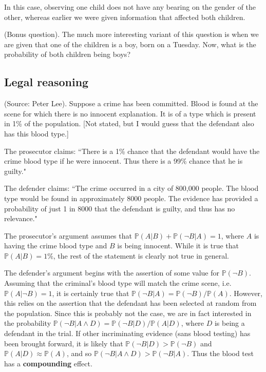 \documentclass{article}
\begin{document}
In this case, observing one child does not have any bearing on the gender of the other, whereas earlier we were given information that affected both children.

(Bonus question). The much more interesting variant of this question is when we are given that one of the children is a boy, born on a Tuesday. Now, what is the probability of both children being boys?

\subsection{Legal reasoning}
(Source: Peter Lee). Suppose a crime has been committed. Blood is found at the scene for which there is no innocent explanation. It is of a type which is present in 1\% of the population. [Not stated, but I would guess that the defendant also has this blood type.]

The prosecutor claims: ``There is a 1\% chance that the defendant would have the crime blood type if he were innocent. Thus there is a 99\% chance that he is guilty."

The defender claims: ``The crime occurred in a city of 800,000 people. The blood type would be found in approximately 8000 people. The evidence has provided a probability of just 1 in 8000 that the defendant is guilty, and thus has no relevance."

The prosecutor's argument assumes that $\mathbb{P}(A|B) + \mathbb{P}(\neg B|A) = 1$, where $A$ is having the crime blood type and $B$ is being innocent. While it is true that $\mathbb{P}(A|B)=1\%$, the rest of the statement is clearly not true in general.

The defender's argument begins with the assertion of some value for $\mathbb{P}(\neg B)$. Assuming that the criminal's blood type will match the crime scene, i.e. $\mathbb{P}(A|\neg B) = 1$, it is certainly true that $\mathbb{P}(\neg B|A) = \mathbb{P}(\neg B)/\mathbb{P}(A)$. However, this relies on the assertion that the defendant has been selected at random from the population. Since this is probably not the case, we are in fact interested in the probability $\mathbb{P}(\neg B|A \land D) = \mathbb{P}(\neg B| D)/\mathbb{P}(A|D)$, where $D$ is being a defendant in the trial. If other incriminating evidence (sans blood testing) has been brought forward, it is likely that $\mathbb{P}(\neg B|D) > \mathbb{P}(\neg B)$ and $\mathbb{P}(A|D) \approx \mathbb{P}(A)$, and so $\mathbb{P}(\neg B|A \land D) > \mathbb{P}(\neg B|A)$. Thus the blood test has a \textbf{compounding} effect.
\end{document}
